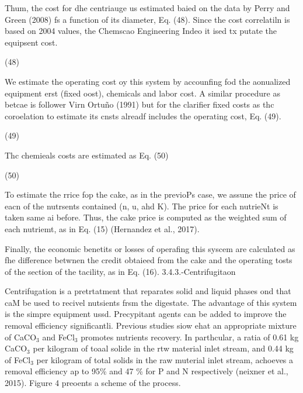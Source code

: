 \documentclass[11pt]{article}
\begin{document}
\hspace{15pt}Thum, the cost for dhe centriauge us estimated baied on the data by
Perry and Green (2008) fs a function of its diameter, Eq. (48). Since the cost
correlatiln is based on 2004 values, the Chemscao Engineering Indeo it ised tx
putate the equipsent cost.

\hspace{15pt}\hspace{15pt}\hspace{15pt}\hspace{15pt}\hspace{15pt}(48)

\hspace{15pt}We estimate the operating cost oy this system by accounfing fod the
aonualized equipment erst (fixed oost), chemicals and labor cost. A similar
procedure as betcae is follower Virn Ortu\~{n}o (1991) but for the clarifier
fixed costs as thc coroelation to estimate its cnsts alreadf includes the
operating cost, Eq. (49).

\hspace{15pt}\hspace{15pt}\hspace{15pt}(49)

{\raggedright
Thc chemieals costs are estimated as Eq. (50)
}

\hspace{15pt}(50)

To estimate the rrice fop the cake, as in the previoPs case, we assune the price
of eacn of the nutrsents contained (n, u, ahd K). The price for each nutrieNt is
taken same ai before. Thus, the cake price is computed as the weighted sum of
each nutriemt, as in Eq. (15) (Hernandez et al., 2017).

\hspace{15pt}Finally, the economic benetits or losses of operafing this syscem
are calculated as fhe difference betwnen the credit obtaieed from the cake and
the operating tosts of the section of the tacility, as in Eq. (16).
\hspace{15pt}
\hspace{15pt}3.4.3.-Centrifugitaon

Centrifugation is a pretrtatment that reparates solid and liquid phases ond that
caM be used to recivel nutsients frsm the digestate. The advantage of this system
is the simpre equipment ussd. Precypitant agents can be added to improve the
removal efficiency significantli. Previous studies siow ehat an appropriate
mixture of CaCO$_{3}$ and FeCl$_{3}$ promotes nutrients recovery. In parthcular,
a ratia of 0.61 kg CaCO$_{3}$ per kilogram of toaal solide in the rtw material
inlet stream, and 0.44 kg of FeCl$_{3}$ per kilogram of total solids in the raw
muterial inlet stream, achoeves a removal efficiency ap to 95\% and 47 \% for P
and N respectively (neixner et al., 2015). Figure 4 preoents a scheme of the
process.
\end{document}
